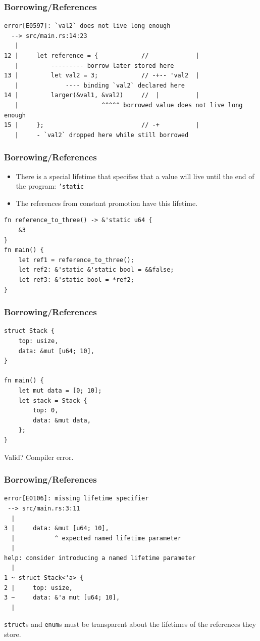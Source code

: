 \begin{frame}[fragile]
    \frametitle{Borrowing/References}
    \begin{verbatim}
error[E0597]: `val2` does not live long enough
  --> src/main.rs:14:23
   |
12 |     let reference = {            //             |
   |         --------- borrow later stored here
13 |         let val2 = 3;            // -+-- 'val2  |
   |             ---- binding `val2` declared here
14 |         larger(&val1, &val2)     //  |          |
   |                       ^^^^^ borrowed value does not live long enough
15 |     };                           // -+          |
   |     - `val2` dropped here while still borrowed
    \end{verbatim}
\end{frame}

\begin{frame}[fragile]
    \frametitle{Borrowing/References}
    \begin{itemize}
        \item There is a special lifetime that specifies that a value will live until the end of the program: \texttt{'static}
        \item The references from constant promotion have this lifetime.
    \end{itemize}
    \pause
    \vfill
    \begin{verbatim}
fn reference_to_three() -> &'static u64 {
    &3
}
fn main() {
    let ref1 = reference_to_three();
    let ref2: &'static &'static bool = &&false;
    let ref3: &'static bool = *ref2;
}
    \end{verbatim}
\end{frame}

\begin{frame}[fragile]
    \frametitle{Borrowing/References}
    \begin{verbatim}
struct Stack {
    top: usize,
    data: &mut [u64; 10],
}

fn main() {
    let mut data = [0; 10];
    let stack = Stack {
        top: 0,
        data: &mut data,
    };
}
    \end{verbatim}
    Valid?
    \pause
    \vfill
    Compiler error.
\end{frame}

\begin{frame}[fragile]
    \frametitle{Borrowing/References}
    \begin{verbatim}
error[E0106]: missing lifetime specifier
 --> src/main.rs:3:11
  |
3 |     data: &mut [u64; 10],
  |           ^ expected named lifetime parameter
  |
help: consider introducing a named lifetime parameter
  |
1 ~ struct Stack<'a> {
2 |     top: usize,
3 ~     data: &'a mut [u64; 10],
  |
    \end{verbatim}
    \pause
    \vfill
    \texttt{struct}s and \texttt{enum}s must be transparent about the lifetimes of the references they store.
\end{frame}

